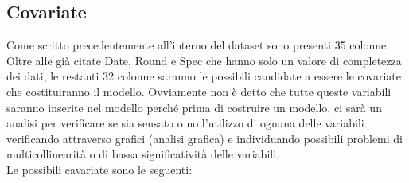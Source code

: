 \subsection{Covariate}

Come scritto precedentemente all'interno del dataset sono presenti 35 colonne. Oltre alle già citate \textsf{Date}, \textsf{Round} e \textsf{Spec} che hanno solo un valore di completezza dei dati, le restanti 32 colonne saranno le possibili candidate a essere le covariate che costituiranno il modello. Ovviamente non è detto che tutte queste variabili saranno inserite nel modello perché prima di costruire un modello, ci sarà un analisi per verificare se sia sensato o no l'utilizzo di ognuna delle variabili verificando attraverso grafici (analisi grafica) e individuando possibili problemi di multicollinearità o di bassa significatività delle variabili.\\ Le possibili cavariate sono le seguenti:
